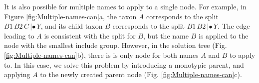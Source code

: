 \documentclass[english]{article}
\begin{document}
It is also possible for multiple names to apply to a single node. For example,
in Figure \ref{fig:Multiple-names-can}a, the taxon $A$ corresponds to the split
$B1\,B2\,C\,|\bullet\,Y$, and its child taxon $B$ corresponds to the split $B1\,B2\,|\bullet\,Y$. The
edge leading to $A$ is consistent with the split for $B$, but the name $B$ is
applied to the node with the smallest include group. However, in the
solution tree (Fig. \ref{fig:Multiple-names-can}b), there is is only node for
both names $A$ and $B$ to apply to. In this case, we solve this problem by
introducing a monotypic parent, and applying $A$ to the newly created parent node
(Fig. \ref{fig:Multiple-names-can}c).
\begin{figure}
\hfill{}
\hfill{}

\end{figure}
\end{document}
